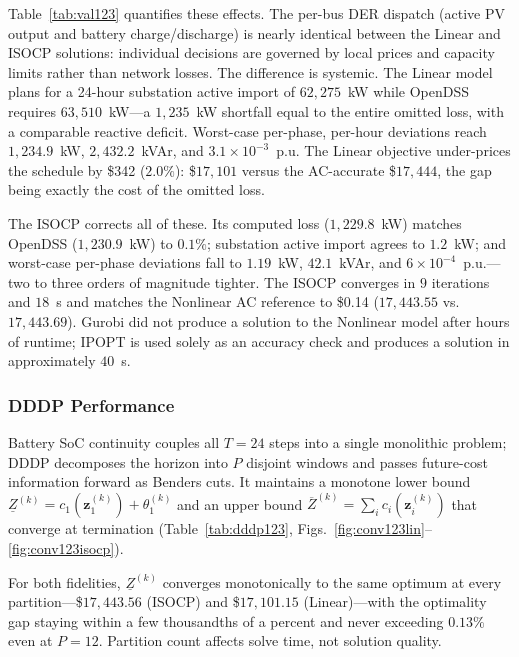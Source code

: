 Table~\ref{tab:val123} quantifies these effects. The per-bus DER dispatch
(active PV output and battery charge/discharge) is nearly identical between the
Linear and ISOCP solutions: individual decisions are governed by local prices and
capacity limits rather than network losses. The difference is systemic. The
Linear model plans for a 24-hour substation active import of $62{,}275$~kW while
OpenDSS requires $63{,}510$~kW---a $1{,}235$~kW shortfall equal to the entire
omitted loss, with a comparable reactive deficit. Worst-case per-phase, per-hour
deviations reach $1{,}234.9$~kW, $2{,}432.2$~kVAr, and $3.1\times10^{-3}$~p.u.
The Linear objective under-prices the schedule by \$342 ($2.0\%$): \$$17{,}101$
versus the AC-accurate \$$17{,}444$, the gap being exactly the cost of the
omitted loss.

The ISOCP corrects all of these. Its computed loss ($1{,}229.8$~kW) matches
OpenDSS ($1{,}230.9$~kW) to $0.1\%$; substation active import agrees to
$1.2$~kW; and worst-case per-phase deviations fall to $1.19$~kW, $42.1$~kVAr,
and $6\times10^{-4}$~p.u.---two to three orders of magnitude tighter. The ISOCP
converges in $9$ iterations and $18$~s and matches the Nonlinear AC reference
to \$0.14 ($17{,}443.55$ vs.\ $17{,}443.69$). Gurobi did not produce a
solution to the Nonlinear model after hours of runtime; IPOPT is used solely
as an accuracy check and produces a solution in approximately $40$~s.

\subsubsection{DDDP Performance}
\label{sssec:123_dddp}

Battery SoC continuity couples all $T\!=\!24$ steps into a single monolithic
problem; DDDP decomposes the horizon into $P$ disjoint windows and passes
future-cost information forward as Benders cuts. It maintains a monotone lower
bound $\underline{Z}^{(k)}\!=\!c_1(\bm{z}_1^{(k)})+\theta_1^{(k)}$ and an upper
bound $\overline{Z}^{(k)}\!=\!\sum_i c_i(\bm{z}_i^{(k)})$ that converge at
termination (Table~\ref{tab:dddp123},
Figs.~\ref{fig:conv123lin}--\ref{fig:conv123isocp}).

For both fidelities, $\underline{Z}^{(k)}$ converges monotonically to the same
optimum at every partition---\$$17{,}443.56$ (ISOCP) and \$$17{,}101.15$
(Linear)---with the optimality gap staying within a few thousandths of a percent
and never exceeding $0.13\%$ even at $P\!=\!12$. Partition count affects solve
time, not solution quality.


